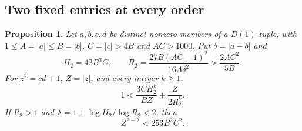 \documentclass[12pt]{article}
\newtheorem{proposition}[theorem]{Proposition}
\numberwithin{equation}{section}
\begin{document}
\subsection{Two fixed entries at every order}

\begin{proposition}\label{lem:ordinary-all-orders}
Let $a,b,c,d$ be distinct nonzero members of a $D(1)$-tuple, with
$1\le A=|a|\le B=|b|$, $C=|c|>4B$ and $AC>1000$.
Put $\delta=|a-b|$ and
\[
 H_2=42B^3C,\qquad
 R_2=\frac{27B(AC-1)^2}{16A\delta^2}
      >\frac{2AC^2}{5B}.
\]
For $z^2=cd+1$, $Z=|z|$, and every integer $k\ge1$,
\begin{equation}\label{eq:ordinary-integer-k}
 1<\frac{3CH_2^k}{BZ}+\frac{Z}{2R_2^k}.
\end{equation}
If $R_2>1$ and $\lambda=1+\log H_2/\log R_2<2$, then
\begin{equation}\label{eq:ordinary-continuous}
 Z^{2-\lambda}<253B^2C^2.
\end{equation}
\end{proposition}
\end{document}
